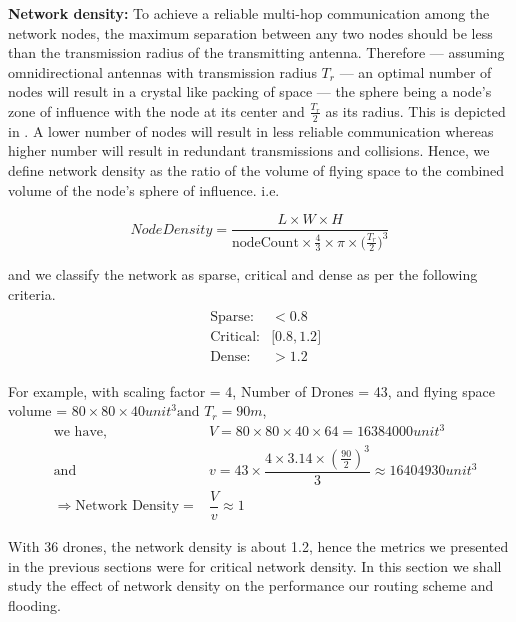 \textbf{Network density:} To achieve a reliable multi-hop communication among the network nodes, the maximum separation between any two nodes should be less than the transmission radius of the transmitting antenna. Therefore --- assuming omnidirectional antennas with transmission radius $T_r$ --- an optimal number of nodes will result in a crystal like packing of space --- the sphere being a node's zone of influence with the node at its center and $\frac{T_r}{2}$ as its radius. This is depicted in . A lower number of nodes will result in less reliable communication whereas higher number will result in redundant transmissions and collisions. Hence, we define network density as the ratio of the volume of flying space to the combined volume of the node's sphere of influence. i.e. 

\begin{equation}
    Node Density = \dfrac{L \times W \times H}{ \text{nodeCount} \times \frac{4}{3} \times \pi \times \big(\frac{T_r}{2} \big)^3}
\end{equation}

and we classify the network as sparse, critical and dense as per the following criteria.
\begin{eqnarray} \label{node_density}
\begin{aligned}
& \text{Sparse:} & < 0.8 \\
& \text{Critical:} & \big[0.8, 1.2 \big]  \\
& \text{Dense:} & > 1.2
\end{aligned}
\end{eqnarray}

For example, with scaling factor = 4, Number of Drones = 43, and flying space volume = $ 80 \times 80 \times 40 unit^3  \text{and } T_r = 90 m $,
\begin{eqnarray*}
& \text{we have,} & V = 80 \times 80 \times 40 \times 64 = 16384000 unit^3 \\
& \text{and} & v = 43 \times \dfrac{4 \times 3.14 \times (\frac{90}{2}) ^ 3}{3} \approx 16404930 unit ^ 3 \\
& \Rightarrow \text{Network Density} = & \dfrac{V}{v} \approx 1
\end{eqnarray*}

With 36 drones, the network density is about 1.2, hence the metrics we presented in the previous sections were for critical network density. In this section we shall study the effect of network density on the performance our routing scheme and flooding.

